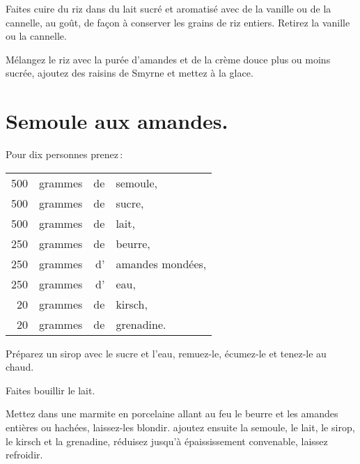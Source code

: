 Faites cuire du riz dans du lait sucré et aromatisé avec de la vanille ou de la
cannelle, au goût, de façon à conserver les grains de riz entiers. Retirez la
vanille ou la cannelle.

Mélangez le riz avec la purée d'amandes et de la crème douce plus ou moins
sucrée, ajoutez des raisins de Smyrne et mettez à la glace.

\section*{\centering Semoule aux amandes.}
{}

Pour dix personnes prenez :

\footnotesize
\begin{longtable}{rrrp{16em}}
    500 & grammes & de & semoule,                                                                         \\
    500 & grammes & de & sucre,                                                                           \\
    500 & grammes & de & lait,                                                                            \\
    250 & grammes & de & beurre,                                                                          \\
    250 & grammes & d' & amandes mondées,                                                                 \\
    250 & grammes & d' & eau,                                                                             \\
     20 & grammes & de & kirsch,                                                                          \\
     20 & grammes & de & grenadine.                                                                       \\
\end{longtable}
\normalsize

Préparez un sirop avec le sucre et l'eau, remuez-le, écumez-le et tenez-le au chaud.

Faites bouillir le lait.

Mettez dans une marmite en porcelaine allant au feu le beurre et les amandes
entières ou hachées, laissez-les blondir. ajoutez ensuite la semoule, le lait, le
sirop, le kirsch et la grenadine, réduisez jusqu'à épaississement convenable, laissez
refroidir.

